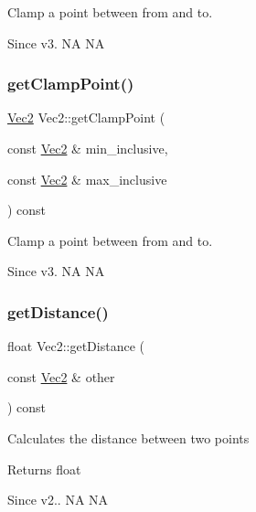 Clamp a point between from and to. \begin{DoxySince}{Since}
v3.  NA  NA 
\end{DoxySince}
\mbox{\label{classVec2_aa51d29f01d1826b236669a718569ffd2}} 
\subsubsection{\texorpdfstring{get\+Clamp\+Point()}{getClampPoint()}\hspace{0.1cm}{\footnotesize\ttfamily [2/2]}}
{\footnotesize\ttfamily \hyperlink{classVec2}{Vec2} Vec2\+::get\+Clamp\+Point (\begin{DoxyParamCaption}\item[{const \hyperlink{classVec2}{Vec2} \&}]{min\+\_\+inclusive,  }\item[{const \hyperlink{classVec2}{Vec2} \&}]{max\+\_\+inclusive }\end{DoxyParamCaption}) const\hspace{0.3cm}{\ttfamily [inline]}}

Clamp a point between from and to. \begin{DoxySince}{Since}
v3.  NA  NA 
\end{DoxySince}
\mbox{\label{classVec2_a44c9c4de94d07758f73195088788ded4}} 
\subsubsection{\texorpdfstring{get\+Distance()}{getDistance()}\hspace{0.1cm}{\footnotesize\ttfamily [1/2]}}
{\footnotesize\ttfamily float Vec2\+::get\+Distance (\begin{DoxyParamCaption}\item[{const \hyperlink{classVec2}{Vec2} \&}]{other }\end{DoxyParamCaption}) const\hspace{0.3cm}{\ttfamily [inline]}}

Calculates the distance between two points \begin{DoxyReturn}{Returns}
float 
\end{DoxyReturn}
\begin{DoxySince}{Since}
v2..  NA  NA 
\end{DoxySince}
\mbox{\label{classVec2_a44c9c4de94d07758f73195088788ded4}} 
